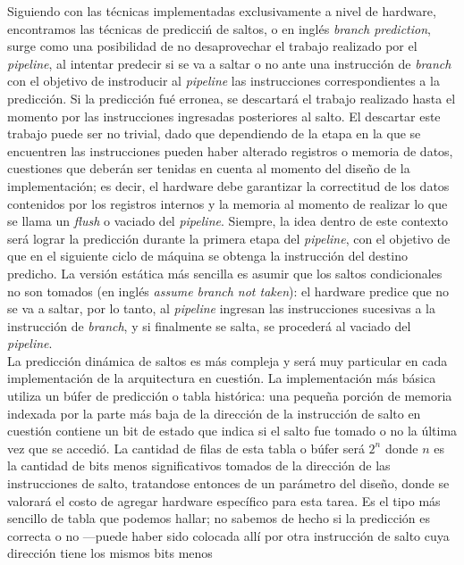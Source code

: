 Siguiendo con las técnicas implementadas exclusivamente a nivel de hardware, 
encontramos las técnicas de predicciń de saltos, o en inglés \emph{branch 
prediction}, surge como una posibilidad de no desaprovechar el trabajo realizado 
por el \emph{pipeline}, al intentar predecir si se va a saltar o no ante una 
instrucción de \emph{branch} con el objetivo de instroducir al \emph{pipeline} 
las instrucciones correspondientes a la predicción. Si la predicción fué 
erronea, se descartará el trabajo realizado hasta el momento por las 
instrucciones ingresadas posteriores al salto. El descartar este trabajo puede 
ser no trivial, dado que dependiendo de la etapa en la que se encuentren las 
instrucciones pueden haber alterado registros o memoria de datos, cuestiones que 
deberán ser tenidas en cuenta al momento del diseño de la implementación; es 
decir, el hardware debe garantizar la correctitud de los datos contenidos por 
los registros internos y la memoria al momento de realizar lo que se llama un 
\emph{flush} o vaciado del \emph{pipeline}. Siempre, la idea dentro de este 
contexto será lograr la predicción durante la primera etapa del 
\emph{pipeline}, con el objetivo de que en el siguiente ciclo de máquina se 
obtenga la instrucción del destino predicho. La versión estática más sencilla es 
asumir que los saltos condicionales no son tomados (en inglés \emph{assume 
branch not taken}): el hardware predice que no se va a saltar, por lo tanto, al 
\emph{pipeline} ingresan las instrucciones sucesivas a la instrucción de 
\emph{branch}, y si finalmente se salta, se procederá al vaciado del 
\emph{pipeline}.\\
La predicción dinámica de saltos es más compleja y será muy particular en cada 
implementación de la arquitectura en cuestión. La implementación más básica 
utiliza un búfer de predicción o tabla histórica: una pequeña porción de 
memoria indexada por la parte más baja de la dirección de la instrucción de 
salto en cuestión contiene un bit de estado que indica si el salto fue tomado o 
no la última vez que se accedió. La cantidad de filas de esta tabla o 
búfer será $2^n$ donde $n$ es la cantidad de bits menos significativos tomados 
de la dirección de las instrucciones de salto, tratandose entonces de un 
parámetro del diseño, donde se valorará el costo de agregar hardware específico 
para esta tarea. Es el tipo más sencillo de tabla que podemos hallar; no sabemos 
de hecho si la predicción es correcta o no ---puede haber sido colocada allí por 
otra instrucción de salto cuya dirección tiene los mismos bits menos 
